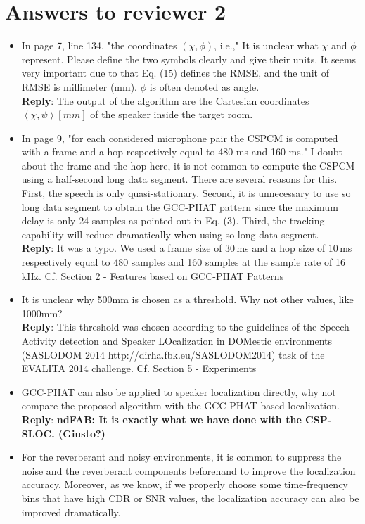 \documentclass[11pt, technote, letterpaper, oneside, onecolumn]{IEEEtran}
\begin{document}
\newpage
\section{Answers to reviewer 2}\label{sec:rev2}
\begin{itemize}
\item In page 7, line 134. "the coordinates $(\chi,\phi)$, i.e.," It is unclear what $\chi$ and $\phi$ represent. Please define the two symbols clearly and give their units. It seems very important due to that Eq. (15) defines the RMSE, and the unit of RMSE is millimeter (mm). $\phi$ is often denoted as angle.\\
\textbf{Reply}:  The output of the algorithm are the Cartesian coordinates $\left \langle \chi,\psi \right \rangle \left [mm\right ]$ of the speaker inside the target room.
\item  In page 9, "for each considered microphone pair the CSPCM is computed with a frame and a hop respectively equal to 480 ms and 160 ms." I doubt about the frame and the hop here, it is not common to compute the CSPCM using a half-second long data segment. There are several reasons for this. First, the speech is only quasi-stationary. Second, it is unnecessary to use so long data segment to obtain the GCC-PHAT pattern since the maximum delay is only 24 samples as pointed out in Eq. (3). Third, the tracking capability will reduce dramatically when using so long data segment.\\
\textbf{Reply}:  It was a typo. We used a frame size of 30\,ms and a hop size of 10\,ms respectively equal to 480 samples and 160 samples at the sample rate of 16\,kHz. Cf. Section 2 - Features based on GCC-PHAT Patterns
\item  It is unclear why 500mm is chosen as a threshold. Why not other values, like 1000mm?\\
\textbf{Reply}: This threshold was chosen according to the guidelines of the Speech Activity detection and Speaker LOcalization in DOMestic environments (SASLODOM 2014 http://dirha.fbk.eu/SASLODOM2014) task of the EVALITA 2014 challenge. Cf. Section 5 - Experiments
\item  GCC-PHAT can also be applied to speaker localization directly, why not compare the proposed algorithm with the GCC-PHAT-based localization. \\
\textbf{Reply}: \textbf{ndFAB: It is exactly what we have done with the CSP-SLOC. (Giusto?)}
\item  For the reverberant and noisy environments, it is common to suppress the noise and the reverberant components beforehand to improve the localization accuracy. Moreover, as we know, if we properly choose some time-frequency bins that have high CDR or SNR values, the localization accuracy can also be improved dramatically.\\

\end{itemize}
\end{document}
